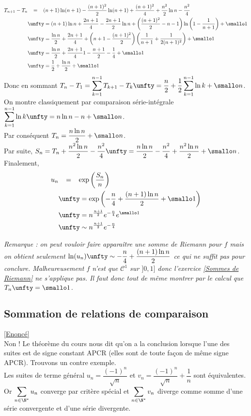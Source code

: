 \documentclass{book}
\begin{document}
	\begin{align*}
		T_{n+1}-T_n&\ \ \,=\ \ \,(n+1)\ln(n+1)-\frac{(n+1)^2}{2}\ln(n+1)+\frac{(n+1)^2}{4}+\frac{n^2}{2}\ln n-\frac{n^2}{4}\\
		&\unfty=(n+1)\ln n+\frac{2n+1}{4}-\frac{2n+1}{2}\ln n+\left(\frac{(n+1)^2}{2}-n-1\right)\ln\left(1-\frac{1}{n+1}\right)+\smallo 1\\
		&\unfty=\frac{\ln n}{2}+\frac{2n+1}{4}+\left(n+1-\frac{(n+1)^2}{2}\right)\left(\frac{1}{n+1}+\frac{1}{2(n+1)^2}\right)+\smallo 1\\
		&\unfty=\frac{\ln n}{2}+\frac{2n+1}{4}1-\frac{n+1}{2}-\frac{1}{4}+\smallo 1\\
		&\unfty=\frac{1}{2}+\frac{\ln n}{2}+\smallo 1
	\end{align*}
	Donc en sommant $T_n-T_1=\displaystyle\sum_{k=1}^{n-1}T_{k+1}-T_k\unfty=\frac{n}{2}+\frac{1}{2}\sum_{k=1}^{n-1}\ln k+\smallo n$.\\
	On montre classiquement par comparaison série-intégrale $\displaystyle\sum_{k=1}^{n-1}\ln k\unfty=n\ln n-n+\smallo n$.\\
	Par conséquent $T_n=\dfrac{n\ln n}{2}+\smallo n$.\\
	Par suite, $S_n=T_n+\displaystyle\frac{n^2\ln n}{2}-\frac{n^2}{4}\unfty=\frac{n\ln n}{2}-\frac{n^2}{4}+\frac{n^2\ln n}{2}+\smallo n$.\\
	Finalement,
	\begin{align*}
		u_n&\ \ \,=\ \ \,\exp\left(\frac{S_n}{n}\right)\\
		&\unfty=\exp\left(-\frac{n}{4}+\frac{(n+1)\ln n}{2}+\smallo 1\right)\\
		&\unfty=n^{\frac{n+1}{2}}e^{-\frac{n}{4}}e^{\smallo 1}\\
		&\unfty\sim n^{\frac{n+1}{2}}e^{-\frac{n}{4}}
	\end{align*}
	
	\textit{Remarque : on peut vouloir faire apparaître une somme de Riemann pour $f$ mais on obtient seulement $\ln(u_n)\unfty\sim-\dfrac{n}{4}+\dfrac{(n+1)\ln n}{2}$ ce qui ne suffit pas pour conclure. Malheureusement $f$ n'est que $\mathcal C^1$ sur $]0,1]$ donc l'exercice \ref{Sommes de Riemann} ne s'applique pas. Il faut donc tout de même montrer par le calcul que $T_n\unfty=\smallo 1$.}
	
	\subsection{Sommation de relations de comparaison }
	\label{sec:sommation-de-relations-de-comparaison}
	\textcolor{blue}{\hyperref[Sommation de relations de comparaison]{[Enoncé]}}\\
	Non ! Le théorème du cours nous dit qu'on a la conclusion lorsque l'une des suites est de signe constant APCR (elles sont de toute façon de même signe APCR). Trouvons un contre exemple.\\
	Les suites de terme général $u_n=\dfrac{(-1)^n}{\sqrt n}$ et $v_n=\dfrac{(-1)^n}{\sqrt n}+\dfrac{1}{n}$ sont équivalentes.
	Or $\displaystyle\sum_{n\in \N^*}u_n$ converge par critère spécial et $\displaystyle\sum_{n\in \N^*}v_n$ diverge comme somme d'une série convergente et d'une série divergente.
	
\end{document}

